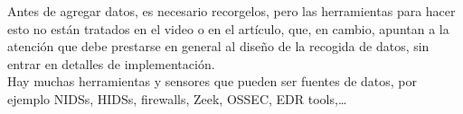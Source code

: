 

Antes de agregar datos, es necesario recorgelos, pero las herramientas para hacer esto no están tratados en el video o en el artículo, que, en cambio, apuntan a la atención que debe prestarse en general al diseño de la recogida de datos, sin entrar en detalles de implementación.\\
Hay muchas herramientas y sensores que pueden ser fuentes de datos, por ejemplo NIDSs, HIDSs, firewalls, Zeek, OSSEC, EDR tools,\dots
{}


